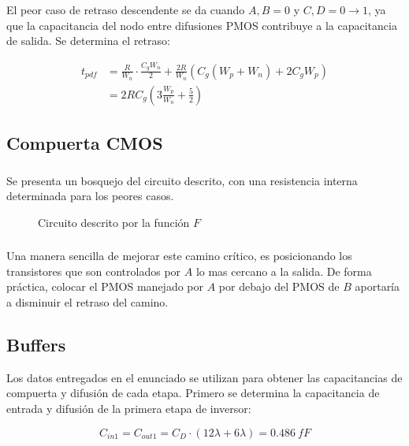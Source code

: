 \documentclass[letterpaper, 12pt]{article}
\numberwithin{equation}{section}
\begin{document}
El peor caso de retraso descendente se da cuando \(A,B=0\) y \(C,D=0\rightarrow 1\), ya que la capacitancia del nodo entre difusiones PMOS contribuye a la capacitancia de salida. Se determina el retraso:

\begin{align}
  t_{pdf} &= \frac{R}{W_n}\cdot \frac{C_gW_n}{2} + \frac{2R}{W_n}\left( C_g (W_p+W_n) + 2C_gW_p\right) \\
          &= 2RC_g\left( 3\frac{W_p}{W_n} + \frac{5}{2}\right)
\end{align}

\subsection{Compuerta CMOS}

\subsubsection{}

Se presenta un bosquejo del circuito descrito, con una resistencia interna determinada para los peores casos.

\begin{figure}[H]
  \centering
  
  \caption{Circuito descrito por la función \(F\)}
\end{figure}

\subsubsection{}

Una manera sencilla de mejorar este camino crítico, es posicionando los transistores que son controlados por \(A\) lo mas cercano a la salida. De forma práctica, colocar el PMOS manejado por \(A\) por debajo del PMOS de \(B\) aportaría a disminuir el retraso del camino.

\subsection{Buffers}

Los datos entregados en el enunciado se utilizan para obtener las capacitancias de compuerta y difusión de cada etapa. Primero se determina la capacitancia de entrada y difusión de la primera etapa de inversor:

\begin{equation}
  C_{in1} = C_{out1} = C_D\cdot (12\lambda + 6\lambda) = \SI{0.486}{fF}
\end{equation}
\end{document}
